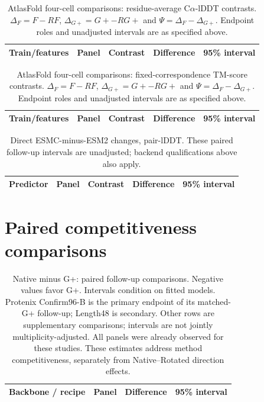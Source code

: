 \begin{table}[htbp]\centering\footnotesize
\caption{AtlasFold four-cell comparisons: residue-average C$\alpha$-lDDT contrasts.
$\Delta_F=F-RF$, $\Delta_{G+}=G+-RG+$ and $\Psi=\Delta_F-\Delta_{G+}$.
Endpoint roles and unadjusted intervals are as specified above.}
\begin{tabular}{lllrr}\toprule
Train/features & Panel & Contrast & Difference & 95\% interval \\\midrule

\end{tabular}\end{table}
\begin{table}[htbp]\centering\footnotesize
\caption{AtlasFold four-cell comparisons: fixed-correspondence TM-score contrasts.
$\Delta_F=F-RF$, $\Delta_{G+}=G+-RG+$ and $\Psi=\Delta_F-\Delta_{G+}$.
Endpoint roles and unadjusted intervals are as specified above.}
\begin{tabular}{lllrr}\toprule
Train/features & Panel & Contrast & Difference & 95\% interval \\\midrule

\end{tabular}\end{table}
\begin{table}[htbp]\centering\footnotesize
\caption{Direct ESMC-minus-ESM2 changes, pair-lDDT. These paired follow-up
intervals are unadjusted; backend qualifications above also apply.}
\begin{tabular}{lllrr}\toprule
Predictor & Panel & Contrast & Difference & 95\% interval \\\midrule

\end{tabular}\end{table}

\clearpage
\section{Paired competitiveness comparisons}
\begin{table}[!htbp]
\caption{Native minus G+: paired follow-up comparisons. Negative values favor
G+. Intervals condition on fitted models. Protenix Confirm96-B is the primary
endpoint of its matched-G+ follow-up; Length48 is secondary. Other rows are
supplementary comparisons; intervals are not jointly multiplicity-adjusted.
All panels were already observed for these studies. These estimates address
method competitiveness, separately from Native--Rotated direction effects.}
\label{tab:gplus}\centering\footnotesize
\begin{tabular}{llrr}\toprule
Backbone / recipe & Panel & Difference & 95\% interval \\\midrule

\end{tabular}
\end{table}

